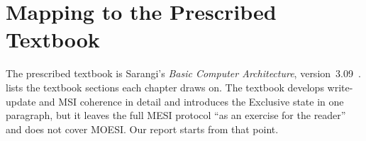 \section{Mapping to the Prescribed Textbook}
\label{sec:intro-textbook}
%

The prescribed textbook is Sarangi's \emph{Basic Computer Architecture},
version~3.09~\cite{sarangi2025basic}.  lists the textbook
sections each chapter draws on. The textbook develops write-update and MSI
coherence in detail and introduces the Exclusive state in one paragraph, but it
leaves the full MESI protocol ``as an exercise for the
reader''~\cite[\S12.4.6, p.~603]{sarangi2025basic} and does not cover MOESI.
Our report starts from that point.

